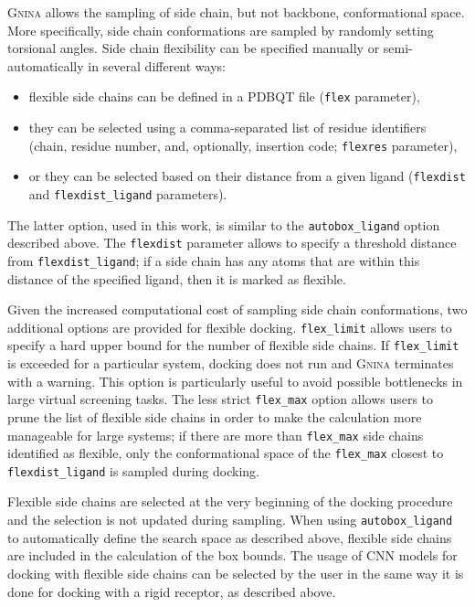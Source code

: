 \documentclass[journal=jcisd8,manuscript=article]{achemso}
\begin{document}
\textsc{Gnina} allows the sampling of side chain, but not backbone, conformational space. More specifically, side chain conformations are sampled by randomly setting torsional angles. Side chain flexibility can be specified manually or semi-automatically in several different ways: 
\begin{itemize}
    \item flexible side chains can be defined in a PDBQT file (\texttt{flex} parameter),
    \item they can be selected using a comma-separated list of residue identifiers (chain, residue number, and, optionally, insertion code; \texttt{flexres} parameter),
    \item or they can be selected based on their distance from a given ligand (\texttt{flexdist} and \texttt{flexdist\_ligand} parameters).
\end{itemize}
The latter option, used in this work, is similar to the \texttt{autobox\_ligand} option described above. The \texttt{flexdist} parameter allows to specify a threshold distance from \texttt{flexdist\_ligand}; if a side chain has any atoms that are within this distance of the specified ligand, then it is marked as flexible. 

Given the increased computational cost of sampling side chain conformations, two additional options are provided for flexible docking. \texttt{flex\_limit} allows users to specify a hard upper bound for the number of flexible side chains. If \texttt{flex\_limit} is exceeded for a particular system, docking does not run and \textsc{Gnina} terminates with a warning. This option is particularly useful to avoid possible bottlenecks in large virtual screening tasks. The less strict \texttt{flex\_max} option allows users to prune the list of flexible side chains in order to make the calculation more manageable for large systems; if there are more than \texttt{flex\_max} side chains identified as flexible, only the conformational space of the \texttt{flex\_max} closest to \texttt{flexdist\_ligand} is sampled during docking.

Flexible side chains are selected at the very beginning of the docking procedure and the selection is not updated during sampling. When using \texttt{autobox\_ligand} to automatically define the search space as described above, flexible side chains are included in the calculation of the box bounds. The usage of CNN models for docking with flexible side chains can be selected by the user in the same way it is done for docking with a rigid receptor, as described above.
\end{document}
